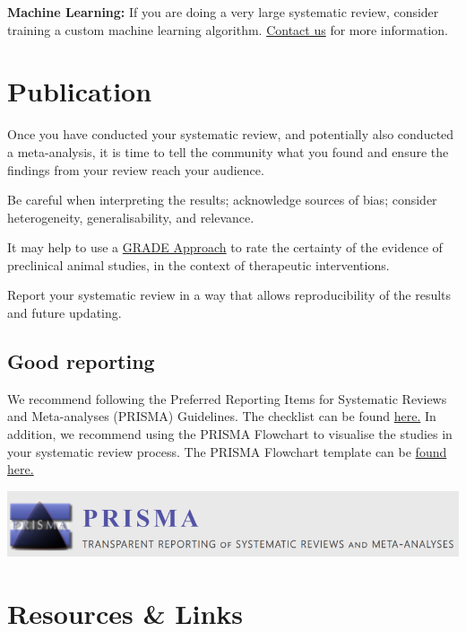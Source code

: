 \documentclass[
]{book}
\begin{document}
\textbf{Machine Learning:}
If you are doing a very large systematic review, consider training a custom machine learning algorithm. \href{mailto:camarades.berlin@charite.de}{Contact us} for more information.

\hypertarget{publication}{%
\chapter{Publication}\label{publication}}

Once you have conducted your systematic review, and potentially also conducted a meta-analysis, it is time to tell the community what you found and ensure the findings from your review reach your audience.

Be careful when interpreting the results; acknowledge sources of bias; consider heterogeneity, generalisability, and relevance.

It may help to use a \href{https://journals.plos.org/plosone/article?id=10.1371/journal.pone.0187271}{GRADE Approach} to rate the certainty of the evidence of preclinical animal studies, in the context of therapeutic interventions.

Report your systematic review in a way that allows reproducibility of the results and future updating.

\hypertarget{good-reporting}{%
\section{Good reporting}\label{good-reporting}}

We recommend following the Preferred Reporting Items for Systematic Reviews and Meta-analyses (PRISMA) Guidelines. The checklist can be found \href{http://www.prisma-statement.org/PRISMAStatement/Checklist}{here.} In addition, we recommend using the PRISMA Flowchart to visualise the studies in your systematic review process. The PRISMA Flowchart template can be \href{http://prisma-statement.org/prismastatement/flowdiagram}{found here.}

\includegraphics{figs/PRISMA.png}

\hypertarget{resources-links}{%
\chapter{Resources \& Links}\label{resources-links}}
\end{document}
